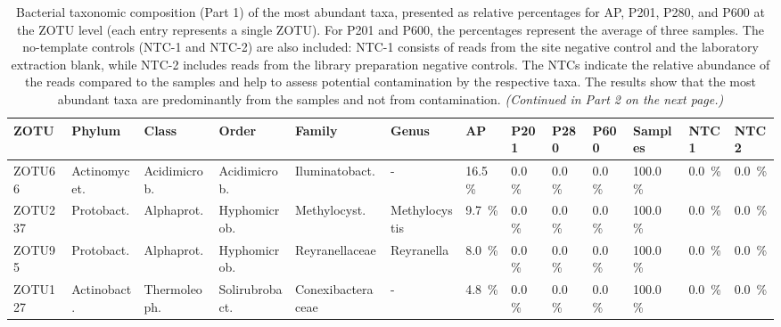 \begin{table}
\centering
\begin{adjustbox}{max width=0.7\textwidth, max totalheight=0.85\textheight, keepaspectratio}
\renewcommand{\arraystretch}{1.5} %
\footnotesize %
\caption{Bacterial taxonomic composition (Part 1) of the most abundant taxa, presented as relative percentages for AP, P201, P280, and P600 at the ZOTU level (each entry represents a single ZOTU).
For P201 and P600, the percentages represent the average of three samples.
The no-template controls (NTC-1 and NTC-2) are also included: NTC-1 consists of reads from the site negative control and the laboratory extraction blank, while NTC-2 includes reads from the library preparation negative controls.
The NTCs indicate the relative abundance of the reads compared to the samples and help to assess potential contamination by the respective taxa.
The results show that the most abundant taxa are predominantly from the samples and not from contamination.
\textit{(Continued in Part 2 on the next page.)}}
\label{tabSI:tax_bac_1}
\begin{tabular}{llllllllll||lll}
\toprule
\textbf{ZOTU} & \textbf{Phylum} & \textbf{Class} & \textbf{Order} & \textbf{Family} & \textbf{Genus} & \textbf{AP} & \textbf{P201} & \textbf{P280} & \textbf{P600} & \textbf{Samples} & \textbf{NTC1} & \textbf{NTC2} \\
\midrule
ZOTU66  & Actinomycet.   & Acidimicrob.   & Acidimicrob.   & Iluminatobact.   & -            & \SI{16.5}{\percent}  & \SI{0.0}{\percent}  & \SI{0.0}{\percent}  & \SI{0.0}{\percent}  & \SI{100.0}{\percent} & \SI{0.0}{\percent}  & \SI{0.0}{\percent} \\
ZOTU237 & Protobact.     & Alphaprot.     & Hyphomicrob.   & Methylocyst.     & Methylocystis & \SI{9.7}{\percent}   & \SI{0.0}{\percent}  & \SI{0.0}{\percent}  & \SI{0.0}{\percent}  & \SI{100.0}{\percent} & \SI{0.0}{\percent}  & \SI{0.0}{\percent} \\
ZOTU95  & Protobact.     & Alphaprot.     & Hyphomicrob.   & Reyranellaceae   & Reyranella    & \SI{8.0}{\percent}   & \SI{0.0}{\percent}  & \SI{0.0}{\percent}  & \SI{0.0}{\percent}  & \SI{100.0}{\percent} & \SI{0.0}{\percent}  & \SI{0.0}{\percent} \\
ZOTU127 & Actinobact.    & Thermoleoph.   & Solirubrobact. & Conexibacteraceae & -            & \SI{4.8}{\percent}   & \SI{0.0}{\percent}  & \SI{0.0}{\percent}  & \SI{0.0}{\percent}  & \SI{100.0}{\percent} & \SI{0.0}{\percent}  & \SI{0.0}{\percent} \\

\end{tabular}
\end{adjustbox}
\end{table}
